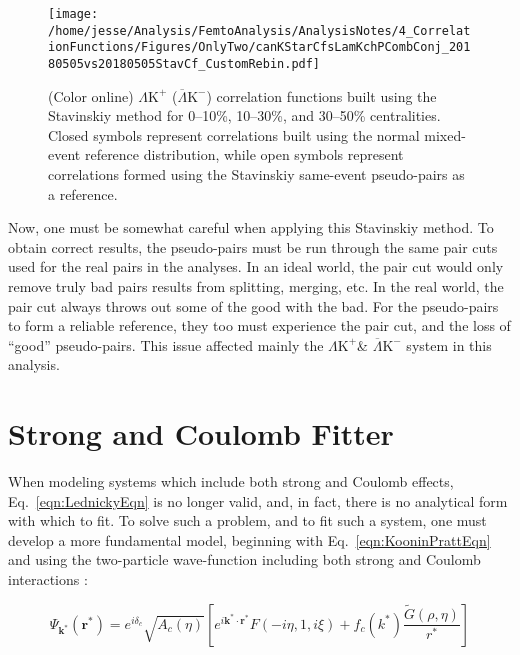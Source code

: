 \documentclass[ALICE,manyauthors]{cernphprep}
\newcommand{\LamKchP}{$\Lambda\mathrm{K^{+}}$\xspace}
\newcommand{\ALamKchM}{$\overline{\Lambda}\mathrm{K^{-}}$\xspace}
\newcommand{\LamKchPALamKchM}{$\Lambda\mathrm{K^{+}}$ ($\overline{\Lambda}\mathrm{K^{-}}$)\xspace}
\begin{document}
\begin{figure}[h!]
  \centering
  \texttt{[image: /home/jesse/Analysis/FemtoAnalysis/AnalysisNotes/4\_CorrelationFunctions/Figures/OnlyTwo/canKStarCfsLamKchPCombConj\_20180505vs20180505StavCf\_CustomRebin.pdf]}
  \caption[\LamKchP Stavinskiy Correlation Functions]
  {
  (Color online) \LamKchPALamKchM correlation functions built using the Stavinskiy method for 0--10\%, 10--30\%, and 30--50\% centralities.  Closed symbols represent correlations built using the normal mixed-event reference distribution, while open symbols represent correlations formed using the Stavinskiy same-event pseudo-pairs as a reference.
  }
  \label{fig:StavCfs_Correct_LamKchP}
\end{figure} 

Now, one must be somewhat careful when applying this Stavinskiy method.  
To obtain correct results, the pseudo-pairs must be run through the same pair cuts used for the real pairs in the analyses.  
In an ideal world, the pair cut would only remove truly bad pairs results from splitting, merging, etc.  
In the real world, the pair cut always throws out some of the good with the bad.  
For the pseudo-pairs to form a reliable reference, they too must experience the pair cut, and the loss of ``good'' pseudo-pairs.  
This issue affected mainly the \LamKchP \& \ALamKchM system in this analysis.



\section{Strong and Coulomb Fitter}
\label{App:CoulombFitter}

When modeling systems which include both strong and Coulomb effects, Eq.\ \ref{eqn:LednickyEqn} is no longer valid, and, in fact, there is no analytical form with which to fit.
To solve such a problem, and to fit such a system, one must develop a more fundamental model, beginning with Eq.\ \ref{eqn:KooninPrattEqn} and using the two-particle wave-function including both strong and Coulomb interactions \cite{Lednicky:2005tb}:

\begin{equation}
 \Psi_{\mathbf{k^{*}}}(\mathbf{r^{*}}) = e^{i\delta_{c}}\sqrt{A_{c}(\eta)}[e^{i\mathbf{k^{*}} \cdot \mathbf{r^{*}}}F(-i\eta,1,i\xi) + f_{c}(k^{*})\frac{\tilde{G}(\rho,\eta)}{r^{*}}]
\label{eqn:CoulombWaveFcn}
\end{equation}
\end{document}
